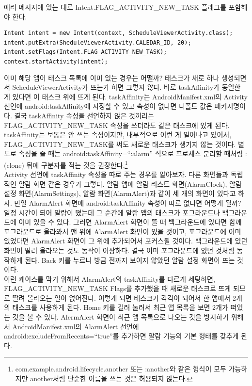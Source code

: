 에러 메시지에 있는 대로 Intent.FLAG\_ACTIVITY\_NEW\_TASK 플래그를 포함해야 한다.
\begin{lstlisting}[frame=single]
Intent intent = new Intent(context, ScheduleViewerActivity.class);
intent.putExtra(SheduleViewerActivity.CALEDAR_ID, 20);
intent.setFlags(Intent.FLAG_ACTIVITY_NEW_TASK);
context.startActivity(intent);
\end{lstlisting}

이미 해당 앱이 태스크 목록에 이미 있는 경우는 어떨까? 태스크가 새로 하나 생성되면서 ScheduleViewerActivity가 뜨는가 하면 그렇지 않다. 바로 taskAffinity가 동일한 게 있다면 이 태스크 위에 뜨게 된다. 
taskAffinity는 AndroidManifest.xml의 Activity 선언에 android:taskAffinity에 지정할 수 있고 속성이 없다면 디폴트 값은 패키지명이다.
결국 taskAffinity 속성을 선언하지 않은 것끼리는 FLAG\_ACTIVITY\_NEW\_TASK 속성을 쓰더라도 같은 태스크에 있게 된다.
taskAffinity는 보통은 안 쓰는 속성이지만, 내부적으로 이런 게 일어나고 있어서, FLAG\_ACTIVITY\_NEW\_TASK를 써도 새로운 태스크가 생기지 않는 것이다.
별도로 속성을 줄 때는 android:taskAffinity=``:alarm'' 식으로 프로세스 분리할 때처럼 :(clone) 뒤에 구분자를 적는 것을 권장한다.\footnote{com.example.android.lifecycle.another 또는 :another와 같은 형식이 모두 가능하지만  another처럼 단순한 이름을 쓰는 것은 허용되지 않는다.}\\

Activity 선언에 taskAffinity 속성을 따로 주는 경우를 알아보자. 다른 화면들과 독립적인 알람 화면 같은 경우가 그렇다. 
알람 앱에 알람 리스트 화면(AlarmClock), 알람 설정 화면(AlarmSettings), 알람 화면(AlarmAlert)과 같이 세 개의 화면이 있다고 하자. 
만일 AlarmAlert 화면에 android:taskAffinity 속성이 따로 없다면 어떻게 될까?
일정 시간이 되어 알람이 떴는데 그 순간에 알람 앱의 태스크가 포그라운드나 백그라운드에 이미 있을 수 있다. 
그러면 AlarmAlert 화면이 뜰 때 백그라운드에 있다면 함께 포그라운드로 올라와서 맨 위에 AlarmAlert 화면이 있을 것이고, 포그라운드에 이미 있었다면 AlarmAlert 화면이 그 위에 추가되어서 포커스될 것이다.
백그라운드에 있던 화면이 딸려 올라오는 것도 동작이 이상하다. 결국 이미 포그라운드에 있던 것처럼 동작하게 된다. Back 키를 누르니 방금 전까지 보이지 않았던 알람 설정 화면이 뜨는 것이다.\\

이런 케이스를 막기 위해서 AlarmAlert의 taskAffinity를 다르게 세팅하면, FLAG\_ACTIVITY\_NEW\_TASK Flags를 추가했을 때 새로운 태스크로 뜨게 되므로 딸려 올라오는 일이 없어진다. 이렇게 되면 태스크가 각각이 되어서 한 앱에서 2개의 태스크를 사용하게 된다.
Home 키를 길러 눌러서 최근 앱 목록을 보면 2개가 떠있는 것을 볼 수 있다. AlermAlert 화면이 최근 앱 목록으로 나오는 것을 방지하기 위해서 AndroidManifest.xml의 AlarmAlert 선언에 android:excludeFromRecents=``true''를 추가하면 알람 기능의 기본 형태를 갖추게 된다.



